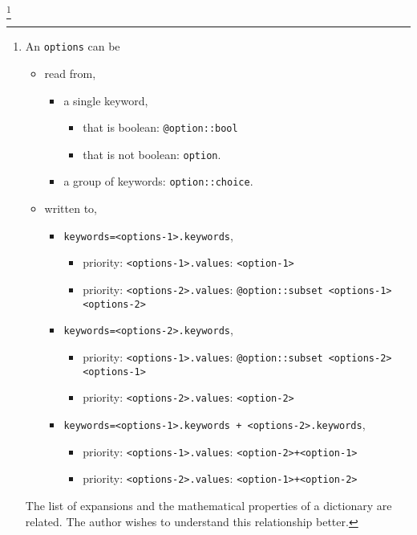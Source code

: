 %
\footnote{An \texttt{options} can be
%
\begin{itemize}
    \item{read from,}
        \begin{itemize}
            \item{a single keyword,}
                \begin{itemize}
                    \item{that is boolean: \texttt{@option::bool}}
                    \item{that is not boolean: \texttt{option}.}
                \end{itemize}
            \item{a group of keywords: \texttt{option::choice}.}
        \end{itemize}
    \item{written to,}
        \begin{itemize}
            \item{\texttt{keywords=<options-1>.keywords},}
                \begin{itemize}
                    \item{priority: \texttt{<options-1>.values}: \texttt{<option-1>}}
                    \item{priority: \texttt{<options-2>.values}: \texttt{@option::subset <options-1> <options-2>}}
                \end{itemize}
            \item{\texttt{keywords=<options-2>.keywords},}
                \begin{itemize}
                    \item{priority: \texttt{<options-1>.values}: \texttt{@option::subset <options-2> <options-1>}}
                    \item{priority: \texttt{<options-2>.values}: \texttt{<option-2>}}
                \end{itemize}
            \item{\texttt{keywords=<options-1>.keywords + <options-2>.keywords},}
                \begin{itemize}
                    \item{priority: \texttt{<options-1>.values}: \texttt{<option-2>+<option-1>}}
                    \item{priority: \texttt{<options-2>.values}: \texttt{<option-1>+<option-2>}}
            \end{itemize}
        \end{itemize}
\end{itemize}
%
The list of expansions and the mathematical properties of a dictionary are related. The author wishes to understand this relationship better.}

